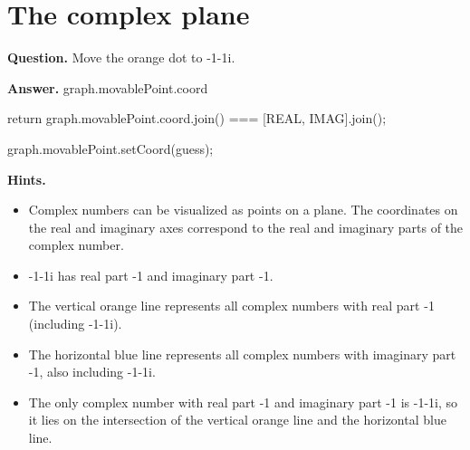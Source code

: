 \documentclass{article}
\begin{document}
\section*{The complex plane}
\textbf{Question.} Move the orange dot to -1-1i.

\textbf{Answer.} graph.movablePoint.coord
                
                
                    return graph.movablePoint.coord.join() === [REAL, IMAG].join();
                
                
                    graph.movablePoint.setCoord(guess);

\textbf{Hints.}
\begin{itemize}
  \item Complex numbers can be visualized as points on a plane. The coordinates on the
                    real and imaginary axes correspond to the real and imaginary parts of the complex number.
  \item -1-1i has real part -1 and imaginary part -1.
  \item The vertical orange line represents all complex numbers with real part -1 (including -1-1i).
  \item The horizontal blue line represents all complex numbers with imaginary part -1, also including -1-1i.
  \item The only complex number with real part -1 and imaginary part -1 is -1-1i,
                        so it lies on the intersection of the vertical orange line and the horizontal blue line.
\end{itemize}
\end{document}
